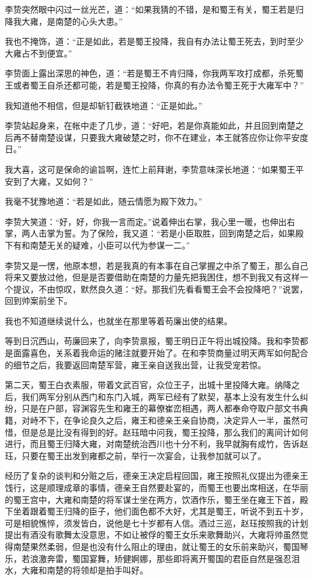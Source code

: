 李贽突然眼中闪过一丝光芒，道：“如果我猜的不错，是和蜀王有关，蜀王若是归降我大雍，是南楚的心头大患。”

我也不掩饰，道：“正是如此，若是蜀王投降，我自有办法让蜀王死去，到时至少大雍占不到便宜。”

李贽面上露出深思的神色，道：“若是蜀王不肯归降，你我两军攻打成都，杀死蜀王或者蜀王自杀还都可能，若是蜀王投降，你真的有办法令蜀王死于大雍军中？”

我知道他不相信，但是却斩钉截铁地道：“正是如此。”

李贽站起身来，在帐中走了几步，道：“好吧，若是你真能如此，并且回到南楚之后再不替南楚设谋，只要我大雍破楚之时，你不在建业，本王就答应你让你平安度日。”

我大喜，这可是保命的谕旨啊，连忙上前拜谢，李贽意味深长地道：“如果蜀王平安到了大雍，又如何？”

我毫不犹豫地道：“若是如此，随云情愿为殿下效力。”

李贽大笑道：“好，好，你我一言而定。”说着伸出右掌，我心里一暖，也伸出右掌，两人击掌为誓。为了保险，我又道：“若是小臣取胜，回到南楚之后，如果殿下有和南楚无关的疑难，小臣可以代为参谋一二。”

李贽又是一愣，他原本想，若是我真的有本事在自己掌握之中杀了蜀王，那么自己将来又要放过他，但是是否要借助在南楚的力量先把我困住，想不到我又有这样一个提议，不由惊叹，默然良久道：“好。那我们先看看蜀王会不会投降吧？”说罢，回到帅案前坐下。

我也不知道继续说什么，也就坐在那里等着苟廉出使的结果。

等到日沉西山，苟廉回来了，向李贽禀报，蜀王明日正午将出城投降。我和李贽都是面露喜色，关系着我命运的赌注就要开始了。在和李贽商量过明天两军如何配合的细节之后，我要返回南楚军营，雍王亲自送我出营，让我受宠若惊。

第二天，蜀王白衣素服，带着文武百官，众位王子，出城十里投降大雍。纳降之后，我们两军分别从西门和东门入城，两军已经有了默契，基本上没有发生什么纠纷，只是在户部，容渊容先生和雍王的幕僚崔峦相遇，两人都奉命夺取户部文书典籍，对峙不下，在争论良久之后，雍王和德亲王亲自协商，决定异人一半，虽然可惜，但是总是比没有得到的好。赵珏暗中问我，蜀王投降，那么我们的离间计如何进行，而且蜀王归降大雍，对南楚统治西川也十分不利，我早就胸有成竹，告诉赵珏，只要在蜀王出发到雍都之前，举行一次宴会，让我参加就可以了。

经历了复杂的谈判和分赃之后，德亲王决定启程回国，雍王按照礼仪提出为德亲王饯行，这是顺理成章的事情，德亲王自然要赴宴的，而蜀王也要出席相送，在华丽的蜀王宫中，大雍和南楚的将军谋士坐在两方，饮酒作乐，蜀王坐在雍王下首，殿下坐着跟着蜀王归降的臣子，他们面色都不大好，尤其是蜀王，听说不到五十岁，可是相貌憔悴，须发皆白，说他是七十岁都有人信。酒过三巡，赵珏按照我的计划提出有酒没有歌舞太没意思，不如让被俘的蜀王女乐来歌舞助兴，大雍将帅虽然觉得南楚果然柔弱，但是也没有什么阻止的理由，就让蜀王的女乐前来助兴，蜀国琴乐，若浪激奔雷，蜀国宴舞，矫健婀娜，那些即将离开蜀国的君臣自然是强忍泪水，大雍和南楚的将领却是拍手叫好。

